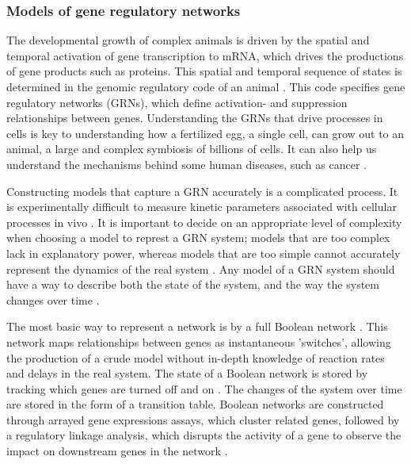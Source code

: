 \documentclass[../main.tex]{subfiles}
\begin{document}
\subsubsection{Models of gene regulatory networks}

The developmental growth of complex animals is driven by the spatial and temporal activation of gene transcription to mRNA, which drives the productions of gene products such as proteins.
This spatial and temporal sequence of states is determined in the genomic regulatory code of an animal \cite{bolouri2002modeling, kuhn2009monte}.
This code specifies gene regulatory networks (GRNs), which define activation- and suppression relationships between genes.
Understanding the GRNs that drive processes in cells is key to understanding how a fertilized egg, a single cell, can grow out to an animal, a large and complex symbiosis of billions of cells.
It can also help us understand the mechanisms behind some human diseases, such as cancer \cite{qian2008inference}.

Constructing models that capture a GRN accurately is a complicated process.
It is experimentally difficult to measure kinetic parameters associated with cellular processes in vivo \cite{bolouri2002modeling}.
It is important to decide on an appropriate level of complexity when choosing a model to represt a GRN system; models that are too complex lack in explanatory power, whereas models that are too simple cannot accurately represent the dynamics of the real system \cite{geard2009dynamical}.
Any model of a GRN system should have a way to describe both the state of the system, and the way the system changes over time \cite{geard2009dynamical}.

The most basic way to represent a network is by a full Boolean network \cite{bolouri2002modeling}.
This network maps relationships between genes as instantaneous 'switches', allowing the production of a crude model without in-depth knowledge of reaction rates and delays in the real system.
The state of a Boolean network is stored by tracking which genes are turned off and on \cite{geard2009dynamical}.
The changes of the system over time are stored in the form of a transition table.
Boolean networks are constructed through arrayed gene expressions assays, which cluster related genes, followed by a regulatory linkage analysis, which disrupts the activity of a gene to observe the impact on downstream genes in the network \cite{bolouri2002modeling, wu2013high}.
\end{document}
